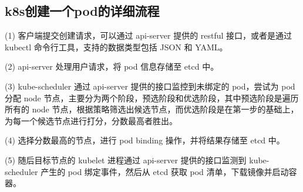 \documentclass[../../../interview-questions.tex]{subfiles}
\begin{document}
\subsection{k8s创建一个pod的详细流程}

(1) 客户端提交创建请求，可以通过 api-server 提供的 restful 接口，或者是通过 kubectl 命令行工具，支持的数据类型包括 JSON 和 YAML。

(2) api-server 处理用户请求，将 pod 信息存储至 etcd 中。

(3) kube-scheduler 通过 api-server 提供的接口监控到未绑定的 pod，尝试为 pod 分配 node 节点，主要分为两个阶段，预选阶段和优选阶段，其中预选阶段是遍历所有的 node 节点，根据策略筛选出候选节点，而优选阶段是在第一步的基础上，为每一个候选节点进行打分，分数最高者胜出。

(4) 选择分数最高的节点，进行 pod binding 操作，并将结果存储至 etcd 中。

(5) 随后目标节点的 kubelet 进程通过 api-server 提供的接口监测到 kube-scheduler 产生的 pod 绑定事件，然后从 etcd 获取 pod 清单，下载镜像并启动容器。
\end{document}
